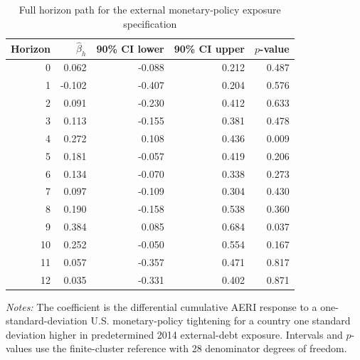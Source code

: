 \begin{table}[htbp]\centering\small
\caption{Full horizon path for the external monetary-policy exposure specification}\label{tab:supp_external_horizons}
\begin{tabular}{rrrrr}\toprule
Horizon & $\hat\beta_h$ & 90\% CI lower & 90\% CI upper & $p$-value\\\midrule
0 & 0.062 & -0.088 & 0.212 & 0.487\\
1 & -0.102 & -0.407 & 0.204 & 0.576\\
2 & 0.091 & -0.230 & 0.412 & 0.633\\
3 & 0.113 & -0.155 & 0.381 & 0.478\\
4 & 0.272 & 0.108 & 0.436 & 0.009\\
5 & 0.181 & -0.057 & 0.419 & 0.206\\
6 & 0.134 & -0.070 & 0.338 & 0.273\\
7 & 0.097 & -0.109 & 0.304 & 0.430\\
8 & 0.190 & -0.158 & 0.538 & 0.360\\
9 & 0.384 & 0.085 & 0.684 & 0.037\\
10 & 0.252 & -0.050 & 0.554 & 0.167\\
11 & 0.057 & -0.357 & 0.471 & 0.817\\
12 & 0.035 & -0.331 & 0.402 & 0.871\\
\bottomrule\end{tabular}
\begin{singlespace}\footnotesize\textit{Notes:} The coefficient is the differential cumulative AERI response to a one-standard-deviation U.S. monetary-policy tightening for a country one standard deviation higher in predetermined 2014 external-debt exposure. Intervals and $p$-values use the finite-cluster reference with 28 denominator degrees of freedom.\end{singlespace}
\end{table}